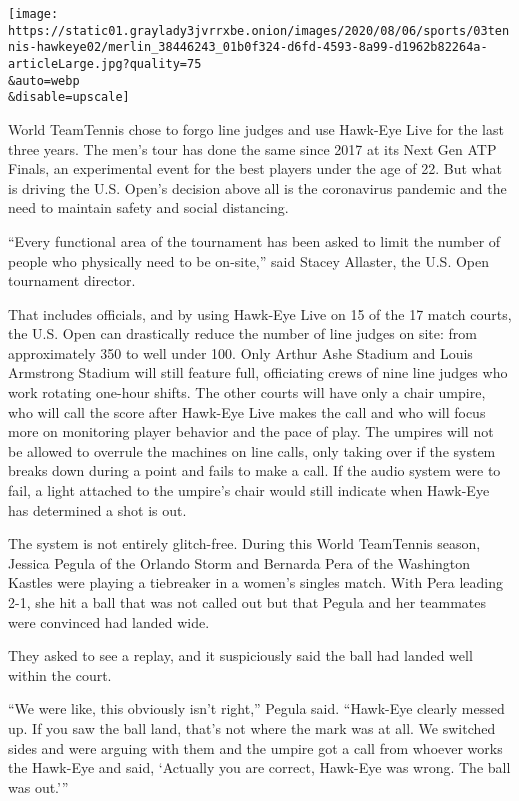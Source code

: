 \texttt{[image: https://static01.graylady3jvrrxbe.onion/images/2020/08/06/sports/03tennis-hawkeye02/merlin\_38446243\_01b0f324-d6fd-4593-8a99-d1962b82264a-articleLarge.jpg?quality=75\\\&auto=webp\\\&disable=upscale]}

World TeamTennis chose to forgo line judges and use Hawk-Eye Live for
the last three years. The men's tour has done the same since 2017 at its
Next Gen ATP Finals, an experimental event for the best players under
the age of 22. But what is driving the U.S. Open's decision above all is
the coronavirus pandemic and the need to maintain safety and social
distancing.

``Every functional area of the tournament has been asked to limit the
number of people who physically need to be on-site,'' said Stacey
Allaster, the U.S. Open tournament director.

That includes officials, and by using Hawk-Eye Live on 15 of the 17
match courts, the U.S. Open can drastically reduce the number of line
judges on site: from approximately 350 to well under 100. Only Arthur
Ashe Stadium and Louis Armstrong Stadium will still feature full,
officiating crews of nine line judges who work rotating one-hour shifts.
The other courts will have only a chair umpire, who will call the score
after Hawk-Eye Live makes the call and who will focus more on monitoring
player behavior and the pace of play. The umpires will not be allowed to
overrule the machines on line calls, only taking over if the system
breaks down during a point and fails to make a call. If the audio system
were to fail, a light attached to the umpire's chair would still
indicate when Hawk-Eye has determined a shot is out.

The system is not entirely glitch-free. During this World TeamTennis
season, Jessica Pegula of the Orlando Storm and Bernarda Pera of the
Washington Kastles were playing a tiebreaker in a women's singles match.
With Pera leading 2-1, she hit a ball that was not called out but that
Pegula and her teammates were convinced had landed wide.

They asked to see a replay, and it suspiciously said the ball had landed
well within the court.

``We were like, this obviously isn't right,'' Pegula said. ``Hawk-Eye
clearly messed up. If you saw the ball land, that's not where the mark
was at all. We switched sides and were arguing with them and the umpire
got a call from whoever works the Hawk-Eye and said, `Actually you are
correct, Hawk-Eye was wrong. The ball was out.'''

